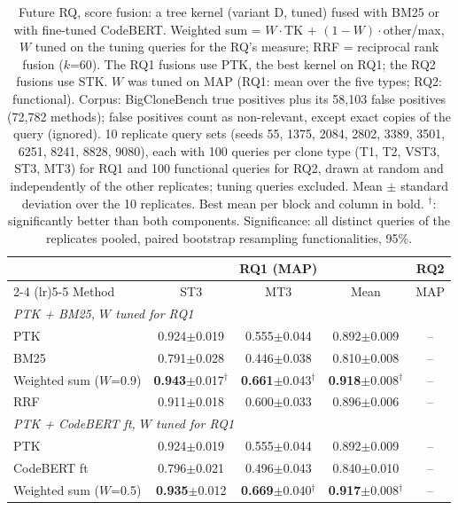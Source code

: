 \begin{table}[!htbp]
\centering
\caption{Future RQ, score fusion: a tree kernel (variant D, tuned) fused with BM25 or with fine-tuned CodeBERT. Weighted sum = $W\cdot$TK + $(1-W)\cdot$other/max, $W$ tuned on the tuning queries for the RQ's measure; RRF = reciprocal rank fusion ($k$=60). The RQ1 fusions use PTK, the best kernel on RQ1; the RQ2 fusions use STK. $W$ was tuned on MAP (RQ1: mean over the five types; RQ2: functional). Corpus: BigCloneBench true positives plus its 58,103 false positives (72,782 methods); false positives count as non-relevant, except exact copies of the query (ignored). 10 replicate query sets (seeds 55, 1375, 2084, 2802, 3389, 3501, 6251, 8241, 8828, 9080), each with 100 queries per clone type (T1, T2, VST3, ST3, MT3) for RQ1 and 100 functional queries for RQ2, drawn at random and independently of the other replicates; tuning queries excluded. Mean $\pm$ standard deviation over the 10 replicates. Best mean per block and column in bold. $^{\dagger}$: significantly better than both components. Significance: all distinct queries of the replicates pooled, paired bootstrap resampling functionalities, 95\%.}
\label{tab:rq4}
\footnotesize
\setlength{\tabcolsep}{3.5pt}
\begin{tabular}{lcccc}
\toprule
 & \multicolumn{3}{c}{RQ1 (MAP)} & RQ2 \\ \cmidrule(lr){2-4} \cmidrule(lr){5-5}
Method & ST3 & MT3 & Mean & MAP \\
\midrule
\multicolumn{5}{l}{\emph{PTK + BM25, $W$ tuned for RQ1}} \\
\quad PTK & 0.924$\pm$0.019 & 0.555$\pm$0.044 & 0.892$\pm$0.009 & -- \\
\quad BM25 & 0.791$\pm$0.028 & 0.446$\pm$0.038 & 0.810$\pm$0.008 & -- \\
\quad Weighted sum ($W$=0.9) & \textbf{0.943}$\pm$0.017$^{\dagger}$ & \textbf{0.661}$\pm$0.043$^{\dagger}$ & \textbf{0.918}$\pm$0.008$^{\dagger}$ & -- \\
\quad RRF & 0.911$\pm$0.018 & 0.600$\pm$0.033 & 0.896$\pm$0.006 & -- \\
\midrule
\multicolumn{5}{l}{\emph{PTK + CodeBERT ft, $W$ tuned for RQ1}} \\
\quad PTK & 0.924$\pm$0.019 & 0.555$\pm$0.044 & 0.892$\pm$0.009 & -- \\
\quad CodeBERT ft & 0.796$\pm$0.021 & 0.496$\pm$0.043 & 0.840$\pm$0.010 & -- \\
\quad Weighted sum ($W$=0.5) & \textbf{0.935}$\pm$0.012 & \textbf{0.669}$\pm$0.040$^{\dagger}$ & \textbf{0.917}$\pm$0.008$^{\dagger}$ & -- \\

\end{tabular}
\end{table}

